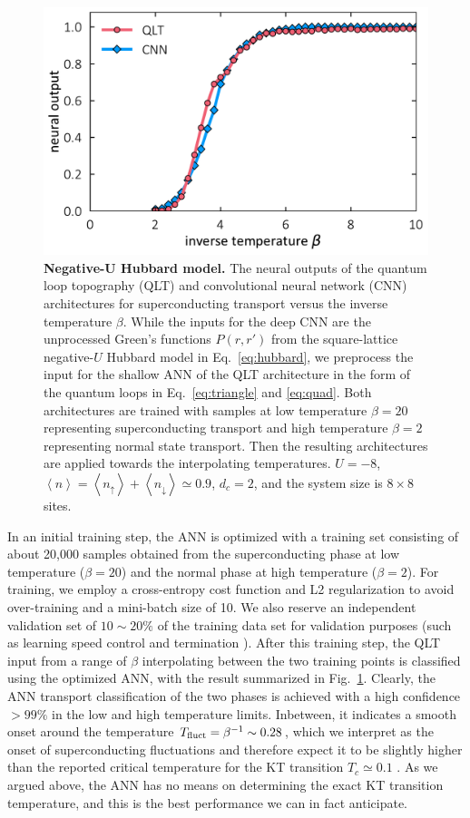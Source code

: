 \documentclass[amsmath,amssymb, aps, prx, longbibliography, twocolumn]{revtex4-1}
\begin{document}
\begin{figure}[t]
\includegraphics[scale=.43]{fig1.pdf}
\caption{
{\bf Negative-U Hubbard model.} The neural outputs of the quantum loop topography (QLT) and convolutional neural network (CNN) architectures for superconducting transport versus the inverse temperature $\beta$. While the inputs for the deep CNN are the unprocessed Green's functions $P(r,r')$ from the square-lattice negative-$U$ Hubbard model in Eq.~\eqref{eq:hubbard}, 
we preprocess the input for the shallow ANN of the QLT architecture in the form of the quantum loops in Eq.~\eqref{eq:triangle} and \ref{eq:quad}. Both architectures are trained with samples at low temperature $\beta=20$ representing superconducting transport and high temperature $\beta=2$ representing normal state transport. Then the resulting architectures are applied towards the interpolating temperatures. $U=-8$, $\left\langle n\right\rangle= \left\langle n_\uparrow\right\rangle+\left\langle n_\downarrow\right\rangle\simeq 0.9$, $d_c=2$, and the system size is $8\times 8$ sites. }\label{fig:hubbard}
\end{figure}


In an initial training step, the ANN is optimized with a training set consisting of about 20,000 samples obtained from the superconducting phase at low temperature ($\beta=20$) and the normal phase at high temperature ($\beta=2$). 
For training, we employ a cross-entropy cost function and L2 regularization to avoid over-training and a mini-batch size of 10. We also reserve an independent validation set of $10\sim 20\%$ of the training data set for validation purposes (such as learning speed control and termination \cite{MLbook}).
After this training step, the QLT input from a range of $\beta$ interpolating between the two training points is classified using the optimized ANN, with the result summarized in Fig.~\ref{fig:hubbard}. 
Clearly, the ANN transport classification of the two phases is achieved with a high confidence  $>99\%$ in the low and high temperature limits. Inbetween, it indicates a smooth onset around the temperature $T_{\rm fluct}=\beta^{-1} \sim 0.28$, which we interpret as the onset of superconducting fluctuations and therefore expect it to be slightly higher than the reported critical temperature for the KT transition $T_c\simeq 0.1$ \cite{Scalapino1993}. As we argued above, the ANN has no means on determining the exact KT transition temperature, and this is the best performance we can in fact anticipate. 
\end{document}
